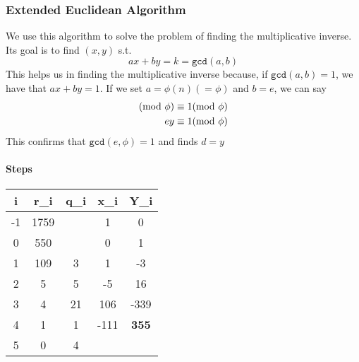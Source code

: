 \subsubsection{Extended Euclidean Algorithm}
We use this algorithm to solve the problem of finding the  multiplicative inverse. Its goal is to find $(x,y)$ s.t.
\begin{equation*}
    ax+by=k=\texttt{gcd}(a,b)
\end{equation*}
This helps us in finding the multiplicative inverse because, if $\texttt{gcd}(a,b)=1$, we have that $ax+by=1$. If we set $a=\phi(n)(=\phi)$ and $b=e$, we can say
\begin{align*}
    [\cancel{(\phi x \Mod\phi)} + (ey \Mod\phi)]\Mod\phi\equiv 1 \Mod\phi \\
    ey\equiv 1 \Mod\phi
\end{align*}
This confirms that $\texttt{gcd}(e,\phi)=1$ and finds $d=y$

\paragraph{Steps}
\begin{wraptable}{r}{0.3\textwidth}
\vspace{-10pt}
\begin{tabular}{|c| c| c| c| c|} 
\hline
i & r_i & q_i & x_i & Y_i \\ [0.5ex] 
\hline\hline
-1 & 1759 &  & 1 & 0\\ 
0 & 550 &  & 0 & 1\\
1 & 109 & 3 & 1 & -3\\
2 & 5 & 5 & -5 & 16\\
3 & 4 & 21 & 106 & -339\\
4 & 1 & 1 & -111 & {\color{blue} \textbf{355}}\\
5 & 0 & 4 & & \\
\hline
\end{tabular}
\end{wraptable}


